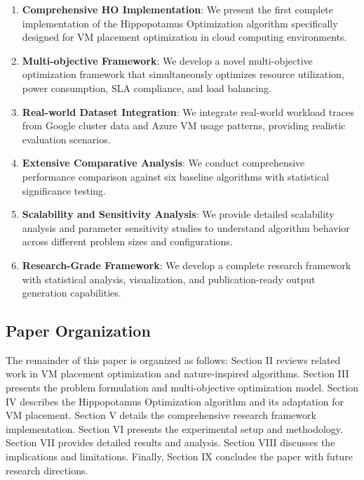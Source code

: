\documentclass[conference]{IEEEtran}
\begin{document}
\begin{enumerate}
    \item \textbf{Comprehensive HO Implementation}: We present the first complete implementation of the Hippopotamus Optimization algorithm specifically designed for VM placement optimization in cloud computing environments.
    
    \item \textbf{Multi-objective Framework}: We develop a novel multi-objective optimization framework that simultaneously optimizes resource utilization, power consumption, SLA compliance, and load balancing.
    
    \item \textbf{Real-world Dataset Integration}: We integrate real-world workload traces from Google cluster data and Azure VM usage patterns, providing realistic evaluation scenarios.
    
    \item \textbf{Extensive Comparative Analysis}: We conduct comprehensive performance comparison against six baseline algorithms with statistical significance testing.
    
    \item \textbf{Scalability and Sensitivity Analysis}: We provide detailed scalability analysis and parameter sensitivity studies to understand algorithm behavior across different problem sizes and configurations.
    
    \item \textbf{Research-Grade Framework}: We develop a complete research framework with statistical analysis, visualization, and publication-ready output generation capabilities.
\end{enumerate}

\subsection{Paper Organization}

The remainder of this paper is organized as follows: Section II reviews related work in VM placement optimization and nature-inspired algorithms. Section III presents the problem formulation and multi-objective optimization model. Section IV describes the Hippopotamus Optimization algorithm and its adaptation for VM placement. Section V details the comprehensive research framework implementation. Section VI presents the experimental setup and methodology. Section VII provides detailed results and analysis. Section VIII discusses the implications and limitations. Finally, Section IX concludes the paper with future research directions.
\end{document}
